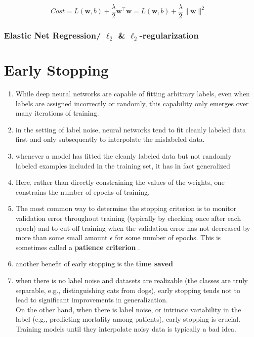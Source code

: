\[
    Cost 
    = L(\mathbf{w}, b) + \dfrac{\lambda}{2} \mathbf{w}^\top\mathbf{w}
    = L(\mathbf{w}, b) + \dfrac{\lambda}{2} \|\mathbf{w}\|^2
\]


\subsubsection{Elastic Net Regression/ $\ell_2$ \& $\ell_2$-regularization \cite{dnn-1,geeksforgeeks.org/regularization-in-machine-learning}} \label{Elastic Net Regression}





\section{Early Stopping \cite{dnn-1}} \label{Early Stopping}

\begin{enumerate}
    \item While deep neural networks are capable of fitting arbitrary labels, even when labels are assigned incorrectly or randomly, this capability only emerges over many iterations of training. 

    \item in the setting of label noise, neural networks tend to fit cleanly labeled data first and only subsequently to interpolate the mislabeled data.

    \item whenever a model has fitted the cleanly labeled data but not randomly labeled examples included in the training set, it has in fact generalized

    \item Here, rather than directly constraining the values of the weights, one constrains the number of epochs of training.

    \item The most common way to determine the stopping criterion is to monitor validation error throughout training (typically by checking once after each epoch) and to cut off training when the validation error has not decreased by more than some small amount $\epsilon$ for some number of epochs. This is sometimes called a \textbf{patience criterion} .

    \item another benefit of early stopping is the \textbf{time saved}

    \item when there is no label noise and datasets are realizable (the classes are truly separable, e.g., distinguishing cats from dogs), early stopping tends not to lead to significant improvements in generalization.\\
    On the other hand, when there is label noise, or intrinsic variability in the label (e.g., predicting mortality among patients), early stopping is crucial.\\
    Training models until they interpolate noisy data is typically a bad idea.
\end{enumerate}




